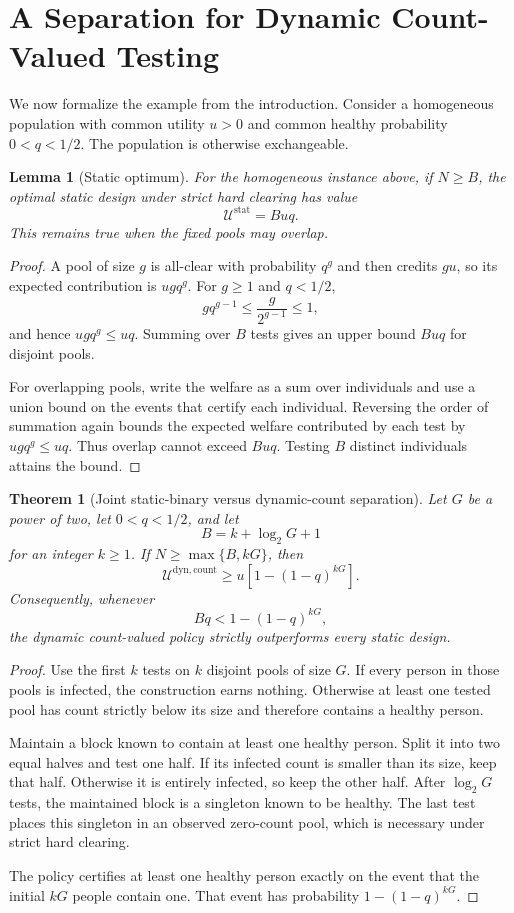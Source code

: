 \documentclass[11pt]{article}
\newtheorem{theorem}{Theorem}
\newtheorem{lemma}{Lemma}
\begin{document}
\section{A Separation for Dynamic Count-Valued Testing}
\label{sec:separation}

We now formalize the example from the introduction. Consider a homogeneous
population with common utility $u>0$ and common healthy probability
$0<q<1/2$. The population is otherwise exchangeable.

\begin{lemma}[Static optimum]
\label{lem:static}
For the homogeneous instance above, if $N\geq B$, the optimal static design
under strict hard clearing has value
\[
  \mathcal U^{\mathrm{stat}}=Buq.
\]
This remains true when the fixed pools may overlap.
\end{lemma}

\begin{proof}
A pool of size $g$ is all-clear with probability $q^g$ and then credits $gu$,
so its expected contribution is $ugq^g$. For $g\geq1$ and $q<1/2$,
\[
  gq^{g-1}\leq \frac{g}{2^{g-1}}\leq1,
\]
and hence $ugq^g\leq uq$. Summing over $B$ tests gives an upper bound $Buq$ for
disjoint pools.

For overlapping pools, write the welfare as a sum over individuals and use a
union bound on the events that certify each individual. Reversing the order of
summation again bounds the expected welfare contributed by each test by
$ugq^g\leq uq$. Thus overlap cannot exceed $Buq$. Testing $B$ distinct
individuals attains the bound.
\end{proof}

\begin{theorem}[Joint static-binary versus dynamic-count separation]
\label{thm:separation}
Let $G$ be a power of two, let $0<q<1/2$, and let
\[
  B=k+\log_2G+1
\]
for an integer $k\geq1$. If $N\geq\max\{B,kG\}$, then
\[
  \mathcal U^{\mathrm{dyn,count}}
  \geq u\left[1-(1-q)^{kG}\right].
\]
Consequently, whenever
\[
  Bq<1-(1-q)^{kG},
\]
the dynamic count-valued policy strictly outperforms every static design.
\end{theorem}

\begin{proof}
Use the first $k$ tests on $k$ disjoint pools of size $G$. If every person in
those pools is infected, the construction earns nothing. Otherwise at least one
tested pool has count strictly below its size and therefore contains a healthy
person.

Maintain a block known to contain at least one healthy person. Split it into two
equal halves and test one half. If its infected count is smaller than its size,
keep that half. Otherwise it is entirely infected, so keep the other half.
After $\log_2G$ tests, the maintained block is a singleton known to be healthy.
The last test places this singleton in an observed zero-count pool, which is
necessary under strict hard clearing.

The policy certifies at least one healthy person exactly on the event that the
initial $kG$ people contain one. That event has probability
$1-(1-q)^{kG}$.
\end{proof}
\end{document}
